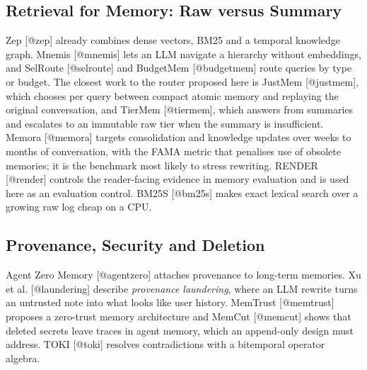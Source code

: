 \subsection{Retrieval for Memory: Raw versus Summary}
Zep [@zep] already combines dense vectors, BM25 and a temporal knowledge graph. Mnemis [@mnemis] lets an LLM navigate a hierarchy without embeddings, and SelRoute [@selroute] and BudgetMem [@budgetmem] route queries by type or budget. The closest work to the router proposed here is JustMem [@justmem], which chooses per query between compact atomic memory and replaying the original conversation, and TierMem [@tiermem], which answers from summaries and escalates to an immutable raw tier when the summary is insufficient. Memora [@memora] targets consolidation and knowledge updates over weeks to months of conversation, with the FAMA metric that penalises use of obsolete memories; it is the benchmark most likely to stress rewriting. RENDER [@render] controls the reader-facing evidence in memory evaluation and is used here as an evaluation control. BM25S [@bm25s] makes exact lexical search over a growing raw log cheap on a CPU.

\subsection{Provenance, Security and Deletion}
Agent Zero Memory [@agentzero] attaches provenance to long-term memories. Xu et al. [@laundering] describe \textit{provenance laundering}, where an LLM rewrite turns an untrusted note into what looks like user history. MemTrust [@memtrust] proposes a zero-trust memory architecture and MemCut [@memcut] shows that deleted secrets leave traces in agent memory, which an append-only design must address. TOKI [@toki] resolves contradictions with a bitemporal operator algebra.

